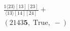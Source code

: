 \documentclass[varwidth, border=5pt]{standalone}
\begin{document}
\begin{my}
$\begin{gathered}
\scriptscriptstyle\frac{1⟨23⟩[13][23]}{⟨13⟩[14][24]} +\\
\scriptscriptstyle(2143𝟓,\;\text{True},\;-) \phantom{+}
\end{gathered}$
\end{my}
\end{document}
